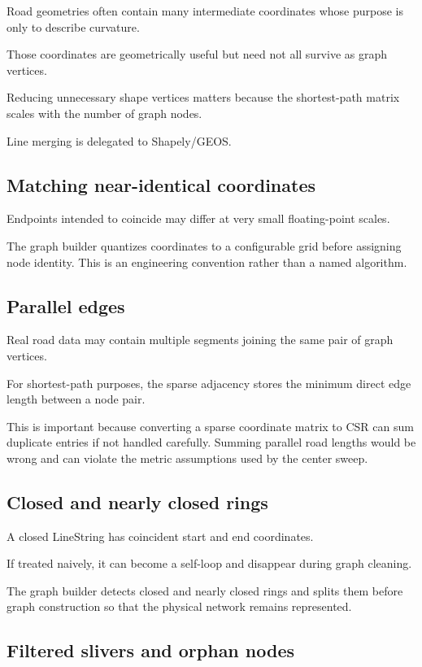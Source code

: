 \documentclass[11pt]{article}
\begin{document}
Road geometries often contain many intermediate coordinates whose purpose is
only to describe curvature.

Those coordinates are geometrically useful but need not all survive as graph
vertices.

Reducing unnecessary shape vertices matters because the shortest-path matrix
scales with the number of graph nodes.

Line merging is delegated to Shapely/GEOS.

\subsection{Matching near-identical coordinates}

Endpoints intended to coincide may differ at very small floating-point scales.

The graph builder quantizes coordinates to a configurable grid before assigning
node identity. This is an engineering convention rather than a named algorithm.

\subsection{Parallel edges}

Real road data may contain multiple segments joining the same pair of graph
vertices.

For shortest-path purposes, the sparse adjacency stores the minimum direct edge
length between a node pair.

This is important because converting a sparse coordinate matrix to CSR can sum
duplicate entries if not handled carefully. Summing parallel road lengths would
be wrong and can violate the metric assumptions used by the center sweep.

\subsection{Closed and nearly closed rings}

A closed LineString has coincident start and end coordinates.

If treated naively, it can become a self-loop and disappear during graph
cleaning.

The graph builder detects closed and nearly closed rings and splits them before
graph construction so that the physical network remains represented.

\subsection{Filtered slivers and orphan nodes}
\end{document}
